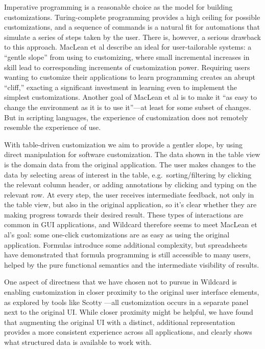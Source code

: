 \documentclass[sigplan,screen,10pt,anonymous,review]{acmart}
\begin{document}
Imperative programming is a reasonable choice as the model for building
customizations. Turing-complete programming provides a high ceiling for
possible customizations, and a sequence of commands is a natural fit for
automations that simulate a series of steps taken by the user. There is,
however, a serious drawback to this approach. MacLean et al
\citep{maclean1990} describe an ideal for user-tailorable systems: a
``gentle slope'' from using to customizing, where small incremental
increases in skill lead to corresponding increments of customization
power. Requiring users wanting to customize their applications to learn
programming creates an abrupt ``cliff,'' exacting a significant
investment in learning even to implement the simplest customizations.
Another goal of MacLean et al is to make it ``as easy to change the
environment as it is to use it''---at least for some subset of changes.
But in scripting languages, the experience of customization does not
remotely resemble the experience of use.

With table-driven customization we aim to provide a gentler slope, by
using direct manipulation for software customization. The data shown in
the table view is the domain data from the original application. The
user makes changes to the data by selecting areas of interest in the
table, e.g.~sorting/filtering by clicking the relevant column header, or
adding annotations by clicking and typing on the relevant row. At every
step, the user receives intermediate feedback, not only in the table
view, but also in the original application, so it's clear whether they
are making progress towards their desired result. These types of
interactions are common in GUI applications, and Wildcard therefore
seems to meet MacLean et al's goal: some one-click customizations are as
easy as using the original application. Formulas introduce some
additional complexity, but spreadsheets have demonstrated that formula
programming is still accessible to many users, helped by the pure
functional semantics and the intermediate visibility of results.

One aspect of directness that we have chosen not to pursue in Wildcard
is enabling customization in closer proximity to the original user
interface elements, as explored by tools like Scotty
\citep{eagan2011}---all customization occurs in a separate panel next to
the original UI. While closer proximity might be helpful, we have found
that augmenting the original UI with a distinct, additional
representation provides a more consistent experience across all
applications, and clearly shows what structured data is available to
work with.
\end{document}
